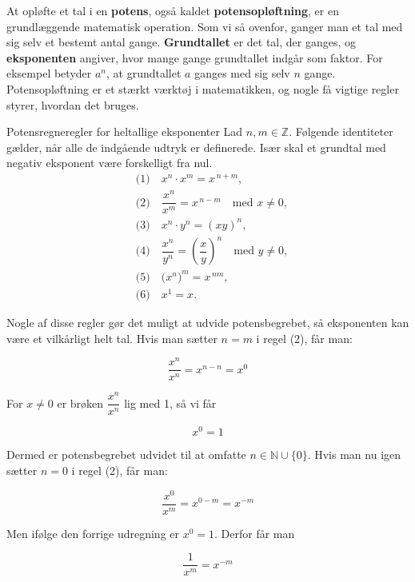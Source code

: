 At opløfte et tal i en \textbf{potens}, også kaldet \textbf{potensopløftning}, er en grundlæggende matematisk operation. Som vi så ovenfor, ganger man et tal med sig selv et bestemt antal gange. \textbf{Grundtallet} er det tal, der ganges, og \textbf{eksponenten} angiver, hvor mange gange grundtallet indgår som faktor. For eksempel betyder \(a^n\), at grundtallet \(a\) ganges med sig selv \(n\) gange. Potensopløftning er et stærkt værktøj i matematikken, og nogle få vigtige regler styrer, hvordan det bruges.

\begin{proposition}{Potensregneregler for heltallige eksponenter}
\label{prop:DefPow}
Lad $n,m\in\mathbb{Z}$. Følgende identiteter gælder, når alle de indgående udtryk er definerede. Især skal et grundtal med negativ eksponent være forskelligt fra nul.
\[
\begin{aligned}
&\text{(1)}\quad x^{n}\cdot x^{m}=x^{\,n+m},\\[2pt]
&\text{(2)}\quad \dfrac{x^{n}}{x^{m}}=x^{\,n-m}\quad \text{med } x\neq 0,\\[2pt]
&\text{(3)}\quad x^{n}\cdot y^{n}=(xy)^{n},\\[2pt]
&\text{(4)}\quad \dfrac{x^{n}}{y^{n}}=\left(\dfrac{x}{y}\right)^{n}\quad \text{med } y\neq 0,\\[2pt]
&\text{(5)}\quad \bigl(x^{n}\bigr)^{m}=x^{\,nm},\\[2pt]
&\text{(6)}\quad x^{1}=x.
\end{aligned}
\]
\end{proposition}


Nogle af disse regler gør det muligt at udvide potensbegrebet, så eksponenten kan være et vilkårligt helt tal. Hvis man sætter \(n = m\) i regel (2), får man:

\[
\frac{x^n}{x^n} = x^{n-n} = x^0
\]

For \(x\neq 0\) er brøken \(\dfrac{x^n}{x^n}\) lig med 1, så vi får

\[
x^0 = 1
\]

Dermed er potensbegrebet udvidet til at omfatte \(n \in \mathbb{N} \cup \{0\}\). Hvis man nu igen sætter \(n = 0\) i regel (2), får man:

\[
\frac{x^0}{x^m} = x^{0-m} = x^{-m}
\]

Men ifølge den forrige udregning er \(x^0 = 1\). Derfor får man

\begin{equation*}
 \frac{1}{x^m} = x^{-m}   
\end{equation*}

